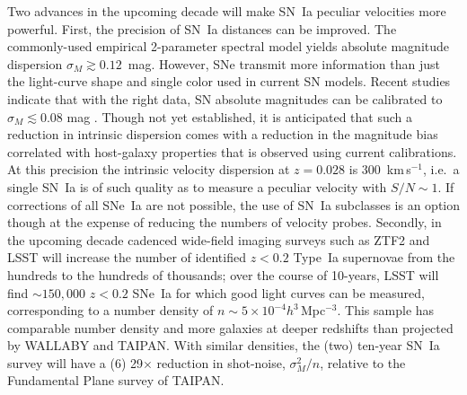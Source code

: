 \documentclass[11pt, oneside]{article}   	%
\begin{document}
Two advances in the upcoming decade will make SN~Ia peculiar velocities more powerful.
First, the precision of SN~Ia distances can be improved.  The commonly-used empirical 2-parameter spectral model yields  absolute magnitude
dispersion $\sigma_M \gtrsim 0.12$~mag.  However, SNe transmit more information than just the light-curve shape and single color used in current SN models.
Recent studies indicate that with the right data, SN absolute
magnitudes can be calibrated to $\sigma_M \lesssim 0.08$ mag \cite[see e.g.][]{2012MNRAS.425.1007B, 2015ApJ...815...58F}. 
Though not yet
established, it is anticipated that such a reduction in intrinsic dispersion comes with a reduction in the magnitude bias correlated with host-galaxy properties
that is observed using current calibrations.  At this precision the intrinsic velocity dispersion  at $z=0.028$ is  $300$~km\,s$^{-1}$, i.e.\ a single SN~Ia  is of such quality as to
measure a peculiar velocity with $S/N \sim 1$.
 If corrections of all SNe~Ia are not possible, the use of SN~Ia subclasses is an option though at the expense of reducing the
numbers of velocity probes.
Secondly,  in the upcoming decade cadenced wide-field imaging surveys such as ZTF2 and LSST
  will increase the number of identified  $z<0.2$ Type~Ia supernovae from the hundreds to the
hundreds of thousands; over the course of 10-years, LSST will find $\sim150,000$ $z<0.2$ SNe~Ia
 for which good light curves can be measured, corresponding to a  number density of $n \sim 5\times 10^{-4}h^3$\,Mpc$^{-3}$.
  This sample has comparable
 number density and more galaxies at deeper redshifts than projected by WALLABY and TAIPAN.  With similar densities,
 the (two) ten-year SN~Ia survey will have
 a (6) 29$\times$ reduction in shot-noise, $\sigma^2_M/n$, relative to the Fundamental Plane survey of TAIPAN.
\end{document}
